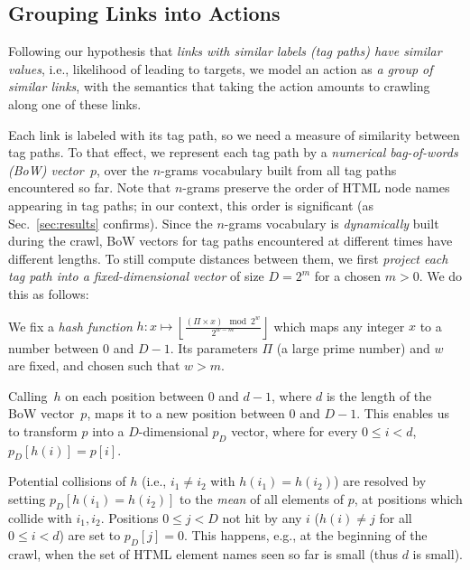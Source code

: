\subsection{Grouping Links into Actions}\label{subsection:group-links}

Following our hypothesis that \emph{links with similar labels (tag paths) have similar values}, i.e., likelihood of leading to targets, we model an action as \emph{a group
	of similar links}, with the semantics that taking the action amounts to
      crawling along one of these links.

Each link is labeled with its tag path, so we need a measure of similarity between tag paths.
To that effect, we represent each tag path by a \emph{numerical bag-of-words (BoW) vector~$p$}, over the $n$-grams vocabulary built from all tag paths encountered so far.
Note that $n$-grams preserve the order of HTML node names appearing in tag paths; in our context, this order is significant (as Sec.~\ref{sec:results} confirms).
Since the $n$-grams vocabulary is \emph{dynamically} built during the crawl, BoW vectors for tag paths encountered at different times have different lengths. To still compute distances between them, we first \emph{project each tag path into a fixed-dimensional vector} of size $D = 2^m$ for a chosen $m > 0$. We do this as follows:

\begin{asparaenum}
	\item We fix a \emph{hash function} $h: x\mapsto\left\lfloor\frac{(\Pi \times x) \mod 2^w}{2^{w-m}}\right\rfloor$ which maps
	any integer $x$ to a number between $0$ and $D-1$. Its parameters $\Pi$ (a large prime number) and $w$ are fixed, and chosen such that $w>m$. 
	\item  Calling~$h$ on each position between $0$ and $d-1$, where $d$ is
	the length of the BoW vector~$p$, maps it to a new position between $0$
  and $D-1$. This enables us to transform $p$ into a $D$-dimensional
  $p_D$ vector, where for every $0\leq i<d$, $p_D\left[h(i)\right]=p\left[i\right]$.
	\item Potential collisions of $h$ (i.e., $i_1\neq i_2$ with
	$h\left(i_1\right)=h\left(i_2\right)$) are resolved by setting $p_D\left[h(i_1)=h(i_2)\right]$
	to the \emph{mean} of all elements of $p$, at positions which collide with
	$i_1,i_2$. 
	Positions $0\le j<D$ not hit by any $i$ ($h(i)\ne j$ for all $0\le i<d$) are set to $p_D[j]=0$. This happens, e.g., at the beginning of the crawl, when the set of HTML element names seen so far is small (thus $d$ is small).
\end{asparaenum}


